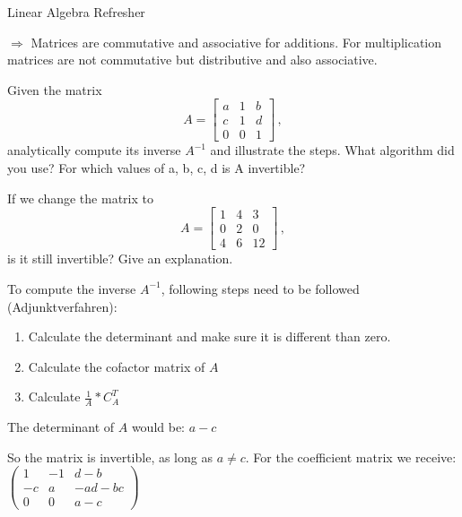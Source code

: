 \documentclass[
	english,
        solution=true
	]{tudaexercise}
\begin{document}
\begin{task}[points=28]{Linear Algebra Refresher}
\begin{subtask}[points=5,title=Matrix Properties]
\begin{solution}
\begin{enumerate}
\end{enumerate}

$\Rightarrow$ Matrices are commutative and associative for additions. For multiplication matrices are not commutative but distributive and also associative.

\end{solution}
\end{subtask}


\begin{subtask}[points=7,title=Matrix Inversion]

Given the matrix
\begin{equation*}
     A = \begin{bmatrix}
     a & 1 & b \\
     c & 1 & d \\
     0 & 0 & 1 \end{bmatrix} \,,
\end{equation*}
analytically compute its inverse $ A^{-1}$ and illustrate the steps. What algorithm did you use?
For which values of a, b, c, d is A invertible?

If we change the matrix to
\begin{equation*}
     A = \begin{bmatrix}
     1 & 4 & 3 \\
     0 & 2 & 0 \\
     4 & 6 & 12 \end{bmatrix} \,,
\end{equation*}
is it still invertible? Give an explanation.

\begin{solution}

To compute the inverse $A^{-1}$, following steps need to be followed (Adjunktverfahren):
\begin{enumerate}
    \item Calculate the determinant and make sure it is different than zero.
    \item Calculate the cofactor matrix of $A$
    \item Calculate $\frac{1}{A}*C_A^T$
\end{enumerate}

The determinant of $A$ would be: $a-c$

So the matrix is invertible, as long as $a \ne c$.
For the coefficient matrix we receive: $\begin{pmatrix}
    1 & -1 & d-b\\-c & a & -ad-bc \\ 0 & 0 & a-c
\end{pmatrix}$\\


\end{solution}
\end{subtask}
\end{task}
\end{document}
